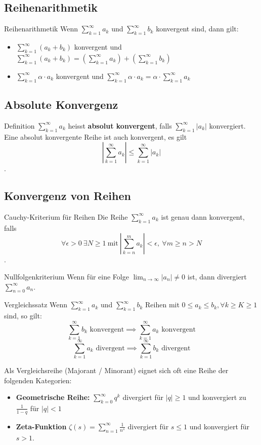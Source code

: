 \documentclass[a4paper,8pt]{extarticle}
\def\limn{\lim_{n\to \infty}}
\def\sumk{\sum_{k=1}^\infty}
\def\sumn{\sum_{n=0}^\infty}
\begin{document}
\subsection{Reihenarithmetik}
\begin{subbox}{Reihenarithmetik}
Wenn $\sumk a_k$ und $\sumk b_k$ konvergent sind, dann gilt:
\begin{itemize}
 \item $\sumk (a_k + b_k)$ konvergent und $\sumk (a_k + b_k) = \left( \sumk a_k \right) + \left( \sumk b_k \right)$
 \item $\sumk \alpha \cdot a_k$ konvergent und $\sumk \alpha \cdot a_k = \alpha \cdot \sumk a_k$
\end{itemize}
\end{subbox}

\subsection{Absolute Konvergenz}
\begin{subbox}{Definition}
$\sumk a_k$ heisst \textbf{absolut konvergent}, falls $\sumk |a_k|$ konvergiert. Eine absolut konvergente Reihe ist auch konvergent, es gilt $$|\sumk a_k| \le \sumk |a_k|$$.
\end{subbox}


\subsection{Konvergenz von Reihen}

\begin{mainbox}{Cauchy-Kriterium für Reihen}
Die Reihe $\sumk a_k$ ist genau dann konvergent, falls $$\forall \epsilon > 0 \ \exists N \ge 1 \ \text{mit} \ | \sum_{k=n}^m a_k | < \epsilon, \ \forall m \ge n > N$$.
\end{mainbox}

\begin{mainbox}{Nullfolgenkriterium}
 Wenn für eine Folge $\limn |a_n| \ne 0$ ist, dann divergiert $\sumn a_n$.
\end{mainbox}


\begin{mainbox}{Vergleichssatz}
Wenn $\sumk a_k$ und $\sumk b_k$ Reihen mit $0 \le a_k \le b_k, \forall k \ge K \ge 1$ sind, so gilt:
$$\sumk b_k \text{ konvergent} \implies \sumk a_k \text{ konvergent}$$ 
$$\sumk a_k \text{ divergent} \implies \sumk b_k \text{ divergent}$$ 
\end{mainbox}

Als Vergleichsreihe (Majorant / Minorant) eignet sich oft eine Reihe der folgenden Kategorien:
\begin{itemize}
  \item \textbf{Geometrische Reihe:} 
  $\sum_{k=0}^\infty q^k$ divergiert für $|q| \ge 1$ und konvergiert zu $\frac{1}{1 - q}$ für $|q| < 1$
  \item \textbf{Zeta-Funktion}
  $\zeta(s) = \sum_{n=1}^\infty \frac{1}{n^s}$ divergiert für $s \le 1$ und konvergiert für $s > 1$.
\end{itemize}
\end{document}

